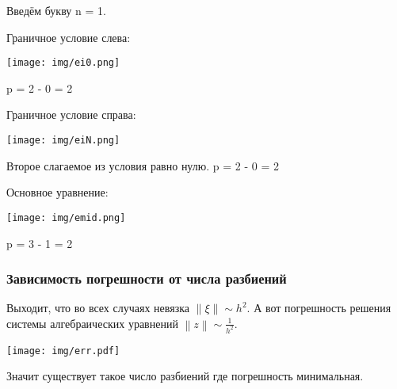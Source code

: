 Введём букву n = 1.

Граничное условие слева:
\begin{center}
  \texttt{[image: img/ei0.png]}
\end{center}
p = 2 - 0 = 2

Граничное условие справа:
\begin{center}
  \texttt{[image: img/eiN.png]}
\end{center}
Второе слагаемое из условия равно нулю.
p = 2 - 0 = 2

Основное уравнение:
\begin{center}
  \texttt{[image: img/emid.png]}
\end{center}
p = 3 - 1 = 2

\subsubsection{Зависимость погрешности от числа разбиений}

Выходит, что во всех случаях невязка $\left\lVert \xi \right\rVert \sim h^2$. А вот  погрешность решения системы алгебраических уравнений $ \left\lVert z \right\rVert \sim \frac{1}{h^2} $.
\begin{center}
  \texttt{[image: img/err.pdf]}
\end{center}

Значит существует такое число разбиений где погрешность минимальная.